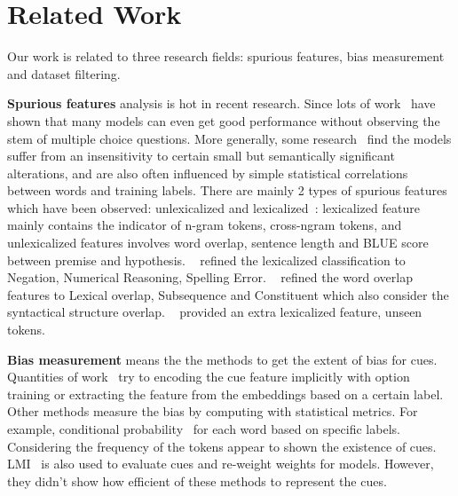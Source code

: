 \section{Related Work}
\label{sec:related}

Our work is related to three research fields: spurious features, bias measurement and dataset filtering.
 
\textbf{Spurious features} analysis is hot in recent research. Since 
lots of work~\cite{sharma2018tackling,srinivasan2018simple,zellers2018swag} 
have shown that many models can even 
get good performance without observing the stem of  multiple choice questions.
More generally, some research~\cite{sanchez2018behavior} find the models suffer
from an insensitivity to certain small but semantically significant alterations, and are also
often influenced by simple statistical correlations between words and training labels. 
There are mainly 2 types of spurious features which have been observed: 
 unlexicalized and  lexicalized~\cite{bowman2015large}:
lexicalized feature mainly contains the indicator of n-gram tokens, cross-ngram tokens, 
and unlexicalized features involves word overlap, sentence length and BLUE score between 
premise and hypothesis. ~\citealp{naik2018stress} refined the lexicalized classification to Negation, Numerical Reasoning, 
Spelling Error. ~\citealp{mccoy2019right} refined the word overlap 
features to Lexical overlap, Subsequence and Constituent 
which also consider the syntactical structure overlap. ~\citealp{sanchez2018behavior} 
provided an extra lexicalized feature, unseen tokens. 

\textbf{Bias measurement} means the the methods to get the extent of bias for cues. 
Quantities of work~\cite{clark2019don,he2019unlearn,yaghoobzadeh2019robust} 
try to encoding the cue feature implicitly with
option training or extracting the feature from the embeddings based on a certain label. 
Other methods measure the bias by computing with statistical metrics. For example, conditional
 probability~\cite{yu2020reclor} for each word based on specific labels. Considering the frequency of 
 the tokens appear to shown the existence of cues. LMI~\cite{schuster2019towards} is 
 also used to evaluate cues and re-weight weights for models. However, they didn't show 
 how efficient of these methods to represent the cues.
 
